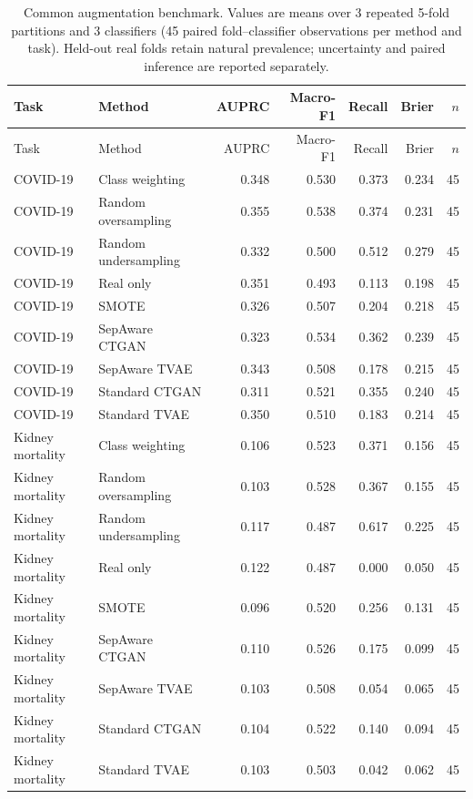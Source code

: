 \begin{longtable}{p{}p{}rrrrr}
\caption{Common augmentation benchmark. Values are means over 3 repeated 5-fold partitions and 3 classifiers (45 paired fold--classifier observations per method and task). Held-out real folds retain natural prevalence; uncertainty and paired inference are reported separately.}\label{tab:common-benchmark}\\
\toprule
Task & Method & AUPRC & Macro-F1 & Recall & Brier & $n$ \\
\midrule
\endfirsthead
\toprule
Task & Method & AUPRC & Macro-F1 & Recall & Brier & $n$ \\
\midrule
\endhead
COVID-19 & Class weighting & 0.348 & 0.530 & 0.373 & 0.234 & 45 \\
COVID-19 & Random oversampling & 0.355 & 0.538 & 0.374 & 0.231 & 45 \\
COVID-19 & Random undersampling & 0.332 & 0.500 & 0.512 & 0.279 & 45 \\
COVID-19 & Real only & 0.351 & 0.493 & 0.113 & 0.198 & 45 \\
COVID-19 & SMOTE & 0.326 & 0.507 & 0.204 & 0.218 & 45 \\
COVID-19 & SepAware CTGAN & 0.323 & 0.534 & 0.362 & 0.239 & 45 \\
COVID-19 & SepAware TVAE & 0.343 & 0.508 & 0.178 & 0.215 & 45 \\
COVID-19 & Standard CTGAN & 0.311 & 0.521 & 0.355 & 0.240 & 45 \\
COVID-19 & Standard TVAE & 0.350 & 0.510 & 0.183 & 0.214 & 45 \\
Kidney mortality & Class weighting & 0.106 & 0.523 & 0.371 & 0.156 & 45 \\
Kidney mortality & Random oversampling & 0.103 & 0.528 & 0.367 & 0.155 & 45 \\
Kidney mortality & Random undersampling & 0.117 & 0.487 & 0.617 & 0.225 & 45 \\
Kidney mortality & Real only & 0.122 & 0.487 & 0.000 & 0.050 & 45 \\
Kidney mortality & SMOTE & 0.096 & 0.520 & 0.256 & 0.131 & 45 \\
Kidney mortality & SepAware CTGAN & 0.110 & 0.526 & 0.175 & 0.099 & 45 \\
Kidney mortality & SepAware TVAE & 0.103 & 0.508 & 0.054 & 0.065 & 45 \\
Kidney mortality & Standard CTGAN & 0.104 & 0.522 & 0.140 & 0.094 & 45 \\
Kidney mortality & Standard TVAE & 0.103 & 0.503 & 0.042 & 0.062 & 45 \\

\end{longtable}
